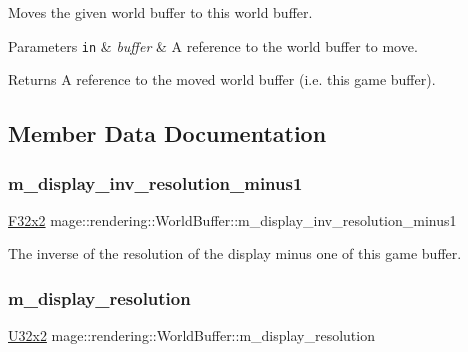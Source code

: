 Moves the given world buffer to this world buffer.


\begin{DoxyParams}[1]{Parameters}
\mbox{\tt in}  & {\em buffer} & A reference to the world buffer to move. \\
\hline
\end{DoxyParams}
\begin{DoxyReturn}{Returns}
A reference to the moved world buffer (i.\+e. this game buffer). 
\end{DoxyReturn}


\subsection{Member Data Documentation}
\hypertarget{structmage_1_1rendering_1_1_world_buffer_a0e560c63f0829df4d772cf05ca1fcffa}{}\label{structmage_1_1rendering_1_1_world_buffer_a0e560c63f0829df4d772cf05ca1fcffa} 
\subsubsection{\texorpdfstring{m\+\_\+display\+\_\+inv\+\_\+resolution\+\_\+minus1}{m\_display\_inv\_resolution\_minus1}}
{\footnotesize\ttfamily \hyperlink{namespacemage_aa87237ad091f5cd7da612b8523fc108f}{F32x2} mage\+::rendering\+::\+World\+Buffer\+::m\+\_\+display\+\_\+inv\+\_\+resolution\+\_\+minus1}

The inverse of the resolution of the display minus one of this game buffer. \hypertarget{structmage_1_1rendering_1_1_world_buffer_aafc4835b9b42d7688b3930768f732ea0}{}\label{structmage_1_1rendering_1_1_world_buffer_aafc4835b9b42d7688b3930768f732ea0} 
\subsubsection{\texorpdfstring{m\+\_\+display\+\_\+resolution}{m\_display\_resolution}}
{\footnotesize\ttfamily \hyperlink{namespacemage_a88e05bff0300120c013285d3dcad95c5}{U32x2} mage\+::rendering\+::\+World\+Buffer\+::m\+\_\+display\+\_\+resolution}

